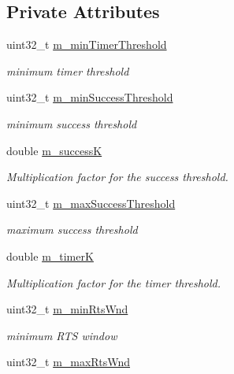 \subsection*{Private Attributes}
\begin{DoxyCompactItemize}
\item 
uint32\+\_\+t \hyperlink{classns3_1_1AarfcdWifiManager_a568403d4a1545d115fa70a262af60c66}{m\+\_\+min\+Timer\+Threshold}
\begin{DoxyCompactList}\small\item\em minimum timer threshold \end{DoxyCompactList}\item 
uint32\+\_\+t \hyperlink{classns3_1_1AarfcdWifiManager_a5a7025c7463f7b1d003f9c3868018b8d}{m\+\_\+min\+Success\+Threshold}
\begin{DoxyCompactList}\small\item\em minimum success threshold \end{DoxyCompactList}\item 
double \hyperlink{classns3_1_1AarfcdWifiManager_a6f0c73ae231af0375391ab04e63cf0b2}{m\+\_\+successK}
\begin{DoxyCompactList}\small\item\em Multiplication factor for the success threshold. \end{DoxyCompactList}\item 
uint32\+\_\+t \hyperlink{classns3_1_1AarfcdWifiManager_a2356178ccd0f0666b94437e1adb33064}{m\+\_\+max\+Success\+Threshold}
\begin{DoxyCompactList}\small\item\em maximum success threshold \end{DoxyCompactList}\item 
double \hyperlink{classns3_1_1AarfcdWifiManager_a0f41cac60afd7763f1dba44288e87db9}{m\+\_\+timerK}
\begin{DoxyCompactList}\small\item\em Multiplication factor for the timer threshold. \end{DoxyCompactList}\item 
uint32\+\_\+t \hyperlink{classns3_1_1AarfcdWifiManager_a5bd5aba48bf7267222ac3592a96a642a}{m\+\_\+min\+Rts\+Wnd}
\begin{DoxyCompactList}\small\item\em minimum R\+TS window \end{DoxyCompactList}\item 
uint32\+\_\+t \hyperlink{classns3_1_1AarfcdWifiManager_a6979a9d7c70e9bb5f4e00655072c505d}{m\+\_\+max\+Rts\+Wnd}

\end{DoxyCompactItemize}
